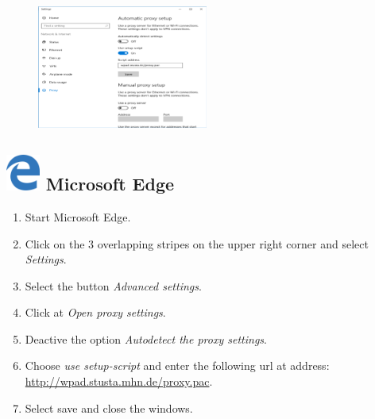 \documentclass[a4paper,12pt]{scrartcl}
\begin{document}
\newpage
\begin{figure}
	\begin{center}
		\includegraphics[width=0.5\textwidth,keepaspectratio]{Bilder/Proxy_Edge_EN}
	\end{center}
\end{figure}

\subsection*{\includegraphics[height=1.2cm,keepaspectratio]{Bilder/Mcrosoft_Edge_logo} Microsoft Edge}
\begin{enumerate}
	\item Start Microsoft Edge.
	\item Click on the 3 overlapping stripes on the upper right corner and select \emph{Settings}.
	\item Select the button \emph{Advanced settings}.
	\item Click at \emph{Open proxy settings}.
	\item Deactive the option \emph{Autodetect the proxy settings}.
	\item Choose \emph{use setup-script} and enter the following url at address: \\ \url{http://wpad.stusta.mhn.de/proxy.pac}.
	\item Select save and close the windows.
\end{enumerate}
\end{document}

